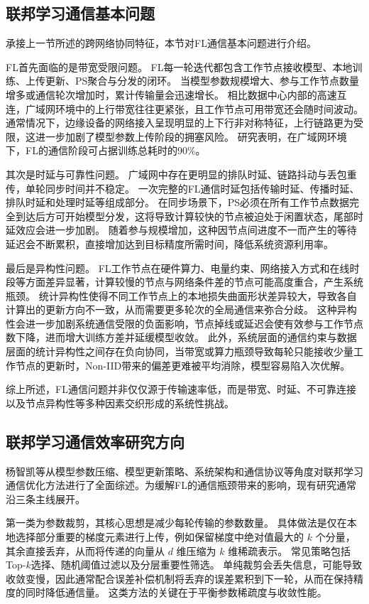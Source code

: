 \documentclass[master, vlined]{DissertUESTC}
\begin{document}
	\subsection{联邦学习通信基本问题}

	承接上一节所述的跨网络协同特征，本节对FL通信基本问题进行介绍。

	FL首先面临的是带宽受限问题。
	FL每一轮迭代都包含工作节点接收模型、本地训练、上传更新、PS聚合与分发的闭环。
	当模型参数规模增大、参与工作节点数量增多或通信轮次增加时，累计传输量会迅速增长。
	相比数据中心内部的高速互连，广域网环境中的上行带宽往往更紧张，且工作节点可用带宽还会随时间波动。
	通常情况下，边缘设备的网络接入呈现明显的上下行非对称特征，上行链路更为受限，这进一步加剧了模型参数上传阶段的拥塞风险。
	研究表明，在广域网环境下，FL的通信阶段可占据训练总耗时的90\%。

	其次是时延与可靠性问题。
	广域网中存在更明显的排队时延、链路抖动与丢包重传，单轮同步时间并不稳定。
	一次完整的FL通信时延包括传输时延、传播时延、排队时延和处理时延等组成部分。
	在同步场景下，PS必须在所有工作节点数据完全到达后方可开始模型分发，这将导致计算较快的节点被迫处于闲置状态，尾部时延效应会进一步加剧。
	随着参与规模增加，这种因节点间进度不一而产生的等待延迟会不断累积，直接增加达到目标精度所需时间，降低系统资源利用率。

	最后是异构性问题。
	FL工作节点在硬件算力、电量约束、网络接入方式和在线时段等方面差异显著，计算较慢的节点与网络条件差的节点可能高度重合，产生系统瓶颈。
	统计异构性使得不同工作节点上的本地损失曲面形状差异较大，导致各自计算出的更新方向不一致，从而需要更多轮次的全局通信来弥合分歧。
	这种异构性会进一步加剧系统通信受限的负面影响，节点掉线或延迟会使有效参与工作节点数下降，进而增大训练方差并延缓模型收敛。
	此外，系统层面的通信约束与数据层面的统计异构性之间存在负向协同，当带宽或算力瓶颈导致每轮只能接收少量工作节点的更新时，Non-IID带来的偏差更难被平均消除，模型容易陷入次优解。

	综上所述，FL通信问题并非仅仅源于传输速率低，而是带宽、时延、不可靠连接以及节点异构性等多种因素交织形成的系统性挑战。

	\subsection{联邦学习通信效率研究方向}

	杨智凯等从模型参数压缩、模型更新策略、系统架构和通信协议等角度对联邦学习通信优化方法进行了全面综述。为缓解FL的通信瓶颈带来的影响，现有研究通常沿三条主线展开。

	第一类为参数裁剪，其核心思想是减少每轮传输的参数数量。
	具体做法是仅在本地选择部分重要的梯度元素进行上传，例如保留梯度中绝对值最大的 $k$ 个分量，其余直接丢弃，从而将传递的向量从 $d$ 维压缩为 $k$ 维稀疏表示。
	常见策略包括Top-$k$选择、随机阈值过滤以及分层重要性筛选。
	单纯裁剪会丢失信息，可能导致收敛变慢，因此通常配合误差补偿机制将丢弃的误差累积到下一轮，从而在保持精度的同时降低通信量。
	这类方法的关键在于平衡参数稀疏度与收敛性能。
\end{document}

